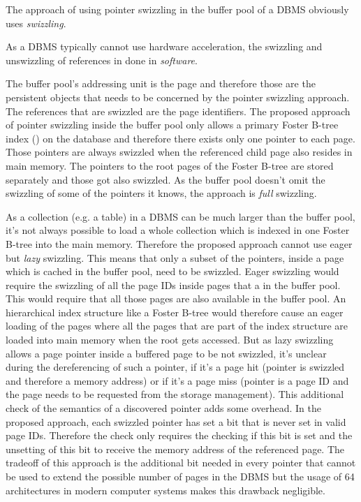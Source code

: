 	The approach of using pointer swizzling in the buffer pool of a DBMS obviously uses \emph{swizzling}.
	
	As a DBMS typically cannot use hardware acceleration, the swizzling and unswizzling of references in done in \emph{software}.
	
	The buffer pool's addressing unit is the page and therefore those are the persistent objects that needs to be concerned by the pointer swizzling approach. The references that are swizzled are the page identifiers. The proposed approach of pointer swizzling inside the buffer pool only allows a primary Foster B-tree index (\cite{Graefe:2012}) on the database and therefore there exists only one pointer to each page. Those pointers are always swizzled when the referenced child page also resides in main memory. The pointers to the root pages of the Foster B-tree are stored separately and those got also swizzled. As the buffer pool doesn't omit the swizzling of some of the pointers it knows, the approach is \emph{full} swizzling.
	
	As a collection (e.g. a table) in a DBMS can be much larger than the buffer pool, it's not always possible to load a whole collection which is indexed in one Foster B-tree into the main memory. Therefore the proposed approach cannot use eager but \emph{lazy} swizzling. This means that only a subset of the pointers, inside a page which is cached in the buffer pool, need to be swizzled. Eager swizzling would require the swizzling of all the page IDs inside pages that a in the buffer pool. This would require that all those pages are also available in the buffer pool. An hierarchical index structure like a Foster B-tree would therefore cause an eager loading of the pages where all the pages that are part of the index structure are loaded into main memory when the root gets accessed. But as lazy swizzling allows a page pointer inside a buffered page to be not swizzled, it's unclear during the dereferencing of such a pointer, if it's a page hit (pointer is swizzled and therefore a memory address) or if it's a page miss (pointer is a page ID and the page needs to be requested from the storage management). This additional check of the semantics of a discovered pointer adds some overhead. In the proposed approach, each swizzled pointer has set a bit that is never set in valid page IDs. Therefore the check only requires the checking if this bit is set and the unsetting of this bit to receive the memory address of the referenced page. The tradeoff of this approach is the additional bit needed in every pointer that cannot be used to extend the possible number of pages in the DBMS but the usage of \SI{64}{\bit} architectures in modern computer systems makes this drawback negligible.
	

